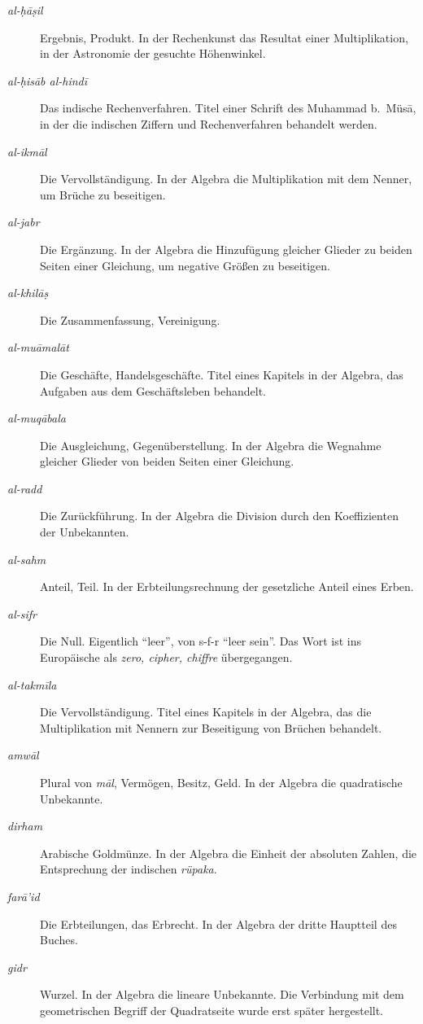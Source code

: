 \documentclass[11pt,a4paper]{article}
\newcommand{\enquote}[1]{``#1''}
\begin{document}
\begin{description}
\item[\textit{al-\d{h}\=a\d{s}il}] Ergebnis, Produkt. In der Rechenkunst das Resultat einer Multiplikation, in der Astronomie der gesuchte H\"ohenwinkel.
\item[\textit{al-\d{h}is\=ab al-hind\=i}] Das indische Rechenverfahren. Titel einer Schrift des Muhammad b.\ M\"us\=a, in der die indischen Ziffern und Rechenverfahren behandelt werden.
\item[\textit{al-ikm\=al}] Die Vervollst\"andigung. In der Algebra die Multiplikation mit dem Nenner, um Br\"uche zu beseitigen.
\item[\textit{al-jabr}] Die Erg\"anzung. In der Algebra die Hinzuf\"ugung gleicher Glieder zu beiden Seiten einer Gleichung, um negative Gr\"o\ss{}en zu beseitigen.
\item[\textit{al-khil\=a\d{s}}] Die Zusammenfassung, Vereinigung.
\item[\textit{al-mu\=amal\=at}] Die Gesch\"afte, Handelsgesch\"afte. Titel eines Kapitels in der Algebra, das Aufgaben aus dem Gesch\"aftsleben behandelt.
\item[\textit{al-muq\=abala}] Die Ausgleichung, Gegen\"uberstellung. In der Algebra die Wegnahme gleicher Glieder von beiden Seiten einer Gleichung.
\item[\textit{al-radd}] Die Zur\"uckf\"uhrung. In der Algebra die Division durch den Koeffizienten der Unbekannten.
\item[\textit{al-sahm}] Anteil, Teil. In der Erbteilungsrechnung der gesetzliche Anteil eines Erben.
\item[\textit{al-sifr}] Die Null. Eigentlich \enquote{leer}, von s-f-r \enquote{leer sein}. Das Wort ist ins Europ\"aische als \textit{zero, cipher, chiffre} \"ubergegangen.
\item[\textit{al-takm\={i}la}] Die Vervollst\"andigung. Titel eines Kapitels in der Algebra, das die Multiplikation mit Nennern zur Beseitigung von Br\"uchen behandelt.
\item[\textit{amw\=al}] Plural von \textit{m\=al}, Verm\"ogen, Besitz, Geld. In der Algebra die quadratische Unbekannte.
\item[\textit{dirham}] Arabische Goldm\"unze. In der Algebra die Einheit der absoluten Zahlen, die Entsprechung der indischen \textit{r\"upaka}.
\item[\textit{far\=a'id}] Die Erbteilungen, das Erbrecht. In der Algebra der dritte Hauptteil des Buches.
\item[\textit{gidr}] Wurzel. In der Algebra die lineare Unbekannte. Die Verbindung mit dem geometrischen Begriff der Quadratseite wurde erst sp\"ater hergestellt.

\end{description}
\end{document}
